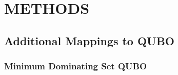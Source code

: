 \documentclass[prd,twocolumn,tightenlines,preprintnumbers,showpacs,superscriptaddress,notitlepage,nofootinbib,eqsecnum,floatfix,longbibliography,aps,10pt]{revtex4-2}
\begin{document}
\section{METHODS}
\label{sec:methods}
\subsection{Additional Mappings to QUBO}
\label{sec:methods:ILP-to-QUBO}
\subsubsection{Minimum Dominating Set QUBO}
\label{sec:methods:mds-qubo}
\end{document}
